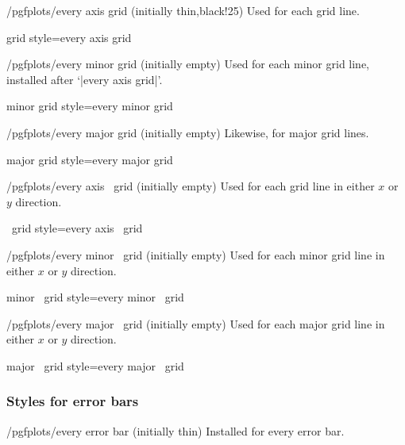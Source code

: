 \begin{stylekey}{/pgfplots/every axis grid (initially thin,black!25)}
 Used for each grid line.
\end{stylekey}

\pgfplotsshortstylekey grid style=every axis grid\pgfeov

\begin{stylekey}{/pgfplots/every minor grid (initially empty)}
 Used for each minor grid line, installed after `|every axis grid|'.
\end{stylekey}

\pgfplotsshortstylekey minor grid style=every minor grid\pgfeov

\begin{stylekey}{/pgfplots/every major grid (initially empty)}
 Likewise, for major grid lines.
\end{stylekey}

\pgfplotsshortstylekey major grid style=every major grid\pgfeov

\begin{xystylekey}{/pgfplots/every axis \x\ grid (initially empty)}
	Used for each grid line in either $x$ or $y$ direction.
\end{xystylekey}

\pgfplotsshortxystylekey \x\ grid style=every axis \x\ grid\pgfeov

\begin{xystylekey}{/pgfplots/every minor \x\ grid (initially empty)}
	Used for each minor grid line in either $x$ or $y$ direction.
\end{xystylekey}

\pgfplotsshortxystylekey minor \x\ grid style=every minor \x\ grid\pgfeov

\begin{xystylekey}{/pgfplots/every major \x\ grid (initially empty)}
	Used for each major grid line in either $x$ or $y$ direction.
\end{xystylekey}

\pgfplotsshortxystylekey major \x\ grid style=every major \x\ grid\pgfeov

\subsubsection*{Styles for error bars}

\begin{stylekey}{/pgfplots/every error bar (initially thin)}
 Installed for every error bar. 
\end{stylekey}

